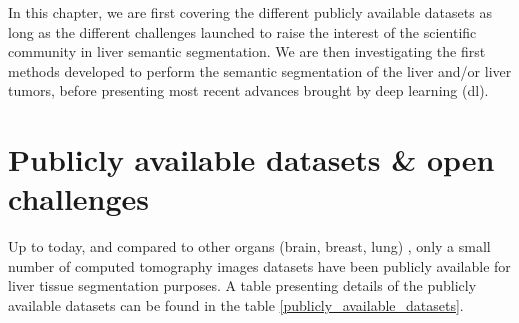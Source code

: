 


In this chapter, we are first covering the different publicly available datasets as long
as the different challenges launched to raise the interest of the scientific community in liver
semantic segmentation. We are then investigating the first methods
developed to perform the semantic segmentation of the liver and/or liver
tumors, before presenting most recent advances brought by deep learning (\ac{dl}).


\section{Publicly available datasets \& open challenges}

Up to today, and compared to other organs (brain, breast, lung) \cite{GrandChallenge}, only
a small number of computed tomography images datasets have been publicly
available for liver tissue segmentation purposes. A table presenting
details of the publicly available datasets can be found in the table \ref{publicly_available_datasets}.



